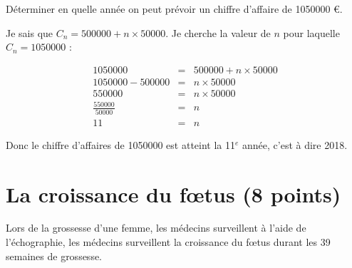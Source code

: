 \documentclass[a4paper,11pt]{exam}
\begin{document}
\begin{questions}
	\question[2] Déterminer en quelle année on peut prévoir un chiffre d'affaire de \num{1050000} €.
	\begin{solution}
		Je sais que $C_n = \num{500000} + n \times \num{50000}$.
		Je cherche la valeur de $n$ pour laquelle $C_n = \num{1050000}$ :
		
		\begin{eqnarray*}
			\num{1050000} &  = & \num{500000} + n \times \num{50000} \\
			\num{1050000} - \num{500000} & = & n \times \num{50000} \\
			\num{550000} & = & n \times \num{50000} \\
			\frac{\num{550000}}{\num{50000}} & = & n \\
			11 &=& n			
		\end{eqnarray*}
	
		Donc le chiffre d'affaires de \num{1050000} est atteint la 11$^e$ année, c'est à dire 2018.
	\end{solution}
	
\end{questions}

\section{La croissance du f\oe tus (8 points)}

Lors de la grossesse d'une femme, les médecins surveillent à l'aide de l'échographie, les médecins surveillent la croissance du f\oe tus durant les 39 semaines de grossesse.
\end{document}
